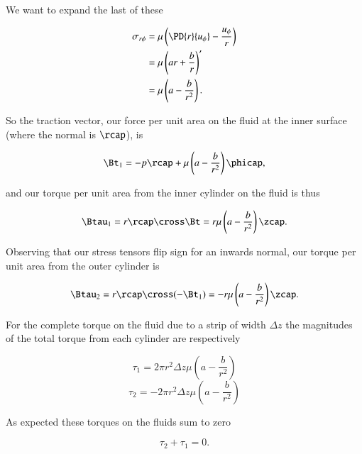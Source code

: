 We want to expand the last of these

\begin{align*}
\sigma_{r \phi} 
&= \mu \left( \PD{r}{u_\phi} - \frac{u_\phi}{r} \right) \\
&= \mu \left( 
a r + \frac{b}{r}
\right)' \\
&= \mu \left( 
a - \frac{b}{r^2}
\right).
\end{align*}

So the traction vector, our force per unit area on the fluid at the inner surface (where the normal is $\rcap$), is

\begin{equation}\label{eqn:couetteFlow:1150}
\Bt_1 = -p \rcap + \mu \left( a - \frac{b}{r^2} \right) \phicap,
\end{equation}

and our torque per unit area from the inner cylinder on the fluid is thus

\begin{equation}\label{eqn:couetteFlow:1170}
\Btau_1 = r \rcap \cross \Bt = r \mu \left( a - \frac{b}{r^2} \right) \zcap.
\end{equation}

Observing that our stress tensors flip sign for an inwards normal, our torque per unit area from the outer cylinder is

\begin{equation}\label{eqn:couetteFlow:1190}
\Btau_2 = r \rcap \cross (-\Bt_1) = -r \mu \left( a - \frac{b}{r^2} \right) \zcap.
\end{equation}

For the complete torque on the fluid due to a strip of width $\Delta z$ the magnitudes of the total torque from each cylinder are respectively

\begin{equation}\label{eqn:couetteFlow:1210}
\tau_1 = 2 \pi r^2 \Delta z \mu \left( a - \frac{b}{r^2} \right)
\end{equation}
\begin{equation}\label{eqn:couetteFlow:1230}
\tau_2 = - 2 \pi r^2 \Delta z \mu \left( a - \frac{b}{r^2} \right)
\end{equation}

As expected these torques on the fluids sum to zero

\begin{equation}\label{eqn:couetteFlow:1250}
\tau_2 + \tau_1 = 0.
\end{equation}

